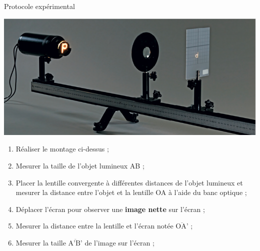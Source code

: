 \begin{doc}{Protocole expérimental}
\begin{center}
    \includegraphics[scale=0.7]{Images/Protocole_lentille.PNG}
\end{center}
   \begin{enumerate}
       \item Réaliser le montage ci-dessus ;
       \item Mesurer la taille de l'objet lumineux AB ;
       \item Placer la lentille convergente à différentes distances de l'objet lumineux et mesurer la distance entre l'objet et la lentille OA à l'aide du banc optique ;
       \item Déplacer l’écran pour observer une \textbf{image nette} sur l’écran ;
       \item Mesurer la distance entre la lentille et l'écran notée $\overline{\text{OA'}}$ ;
       \item Mesurer la taille $\overline{\text{A'B'}}$ de l'image sur l'écran ;
   \end{enumerate}
\end{doc}

